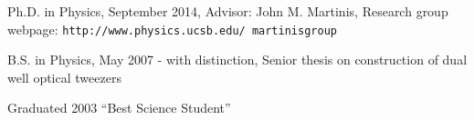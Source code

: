 {
  {Ph.D. in Physics, September 2014},
  {Advisor: John M. Martinis},
  {Research group webpage: \texttt{http://www.physics.ucsb.edu/~martinisgroup}}
}

{
  {B.S. in Physics, May 2007 - with distinction},
  {Senior thesis on construction of dual well optical tweezers}
}

{
  {Graduated 2003 ``Best Science Student''}
}
